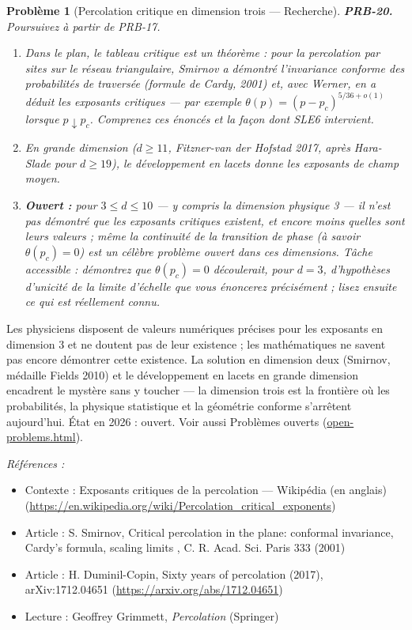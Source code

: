 \documentclass[11pt]{article}
\newtheorem{problem}{Problème}
\newenvironment{refs}{\par\small\noindent\emph{Références :}\begin{itemize}\setlength\itemsep{0pt}}{\end{itemize}\normalsize}
\begin{document}
\bigskip

\begin{problem}[{Percolation critique en dimension trois --- Recherche}]
\textbf{PRB-20.} Poursuivez à partir de PRB-17.
\begin{enumerate}
\item[(i)] Dans le plan, le tableau critique est un théorème : pour la percolation par sites sur le
réseau triangulaire, Smirnov a démontré l'invariance conforme des probabilités de traversée
(formule de Cardy, 2001) et, avec Werner, en a déduit les exposants critiques --- par exemple
$ \theta(p) = (p - p_c)^{5/36 + o(1)} $ lorsque $ p \downarrow p_c $. Comprenez ces énoncés et
la façon dont SLE6 intervient.
\item[(ii)] En grande dimension ($ d \ge 11 $, Fitzner-van der Hofstad 2017, après Hara-Slade pour
$ d \ge 19 $), le développement en lacets donne les exposants de champ moyen.
\item[(iii)] \textbf{Ouvert :} pour $ 3 \le d \le 10 $ --- y compris la dimension physique 3 --- il n'est pas
démontré que les exposants critiques existent, et encore moins quelles sont leurs valeurs ; même la
continuité de la transition de phase (à savoir $ \theta(p_c) = 0 $) est un célèbre problème
ouvert dans ces dimensions. Tâche accessible : démontrez que $ \theta(p_c) = 0 $
\textit{découlerait}, pour $ d = 3 $, d'hypothèses d'unicité de la limite d'échelle que vous
énoncerez précisément ; lisez ensuite ce qui est réellement connu.
\end{enumerate}

\end{problem}

\noindent Les physiciens disposent de valeurs numériques précises pour les exposants en
dimension 3 et ne doutent pas de leur existence ; les mathématiques ne savent pas encore démontrer
cette existence. La solution en dimension deux (Smirnov, médaille Fields 2010) et le développement
en lacets en grande dimension encadrent le mystère sans y toucher --- la dimension trois est la
frontière où les probabilités, la physique statistique et la géométrie conforme s'arrêtent
aujourd'hui. État en 2026 : ouvert. Voir aussi
Problèmes ouverts (\url{open-problems.html}).

\begin{refs}
\item Contexte : Exposants critiques de la percolation --- Wikipédia (en anglais) (\url{https://en.wikipedia.org/wiki/Percolation_critical_exponents})
\item Article : S. Smirnov, \og{} Critical percolation in the plane: conformal invariance, Cardy's formula, scaling limits \fg{}, C. R. Acad. Sci. Paris 333 (2001)
\item Article : H. Duminil-Copin, \og{} Sixty years of percolation \fg{} (2017), arXiv:1712.04651 (\url{https://arxiv.org/abs/1712.04651})
\item Lecture : Geoffrey Grimmett, \textit{Percolation} (Springer)
\end{refs}
\end{document}
